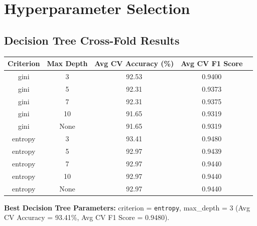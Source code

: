 \documentclass[12pt,a4paper]{article}
\begin{document}
\section{Hyperparameter Selection}

\subsection*{Decision Tree Cross-Fold Results}
\begin{longtable}{ccccc}
\toprule
Criterion & Max Depth & Avg CV Accuracy (\%) & Avg CV F1 Score \\
\midrule
\endhead
gini & 3 & 92.53 & 0.9400 \\
gini & 5 & 92.31 & 0.9373 \\
gini & 7 & 92.31 & 0.9375 \\
gini & 10 & 91.65 & 0.9319 \\
gini & None & 91.65 & 0.9319 \\
entropy & 3 & 93.41 & 0.9480 \\
entropy & 5 & 92.97 & 0.9439 \\
entropy & 7 & 92.97 & 0.9440 \\
entropy & 10 & 92.97 & 0.9440 \\
entropy & None & 92.97 & 0.9440 \\
\bottomrule
\end{longtable}
\textbf{Best Decision Tree Parameters:} criterion = \texttt{entropy}, max\_depth = 3
(Avg CV Accuracy = 93.41\%, Avg CV F1 Score = 0.9480).
\end{document}

